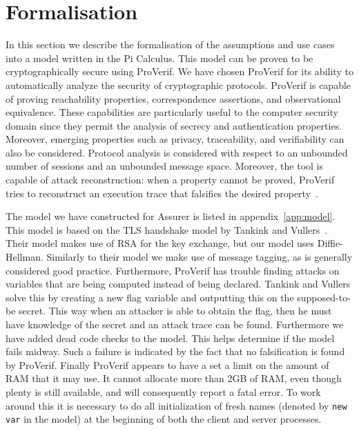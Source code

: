 \section{Formalisation}
\label{sec:formalisation}
In this section we describe the formalisation of the assumptions and use cases into a model written in the Pi Calculus. This model can be proven to be cryptographically secure using ProVerif. We have chosen ProVerif for its ability to automatically analyze the security of cryptographic protocols. ProVerif is capable of proving reachability properties, correspondence assertions, and observational equivalence. These capabilities are particularly useful to the computer security domain since they permit the analysis of secrecy and authentication properties. Moreover, emerging properties such as privacy, traceability, and verifiability can also be considered. Protocol analysis is considered with respect to an unbounded number of sessions and an unbounded message space. Moreover, the tool is capable of attack reconstruction: when a property cannot be proved, ProVerif tries to reconstruct an execution trace that falsifies the desired property~\cite{proverifmanual}.

The model we have constructed for Assurer is listed in appendix~\ref{app:model}. This model is based on the TLS handshake model by Tankink and Vullers~\cite{tankink2008verification}. Their model makes use of RSA for the key exchange, but our model uses Diffie-Hellman. Similarly to their model we make use of message tagging, as is generally considered good practice. Furthermore, ProVerif has trouble finding attacks on variables that are being computed instead of being declared. Tankink and Vullers solve this by creating a new flag variable and outputting this on the supposed-to-be secret. This way when an attacker is able to obtain the flag, then he must have knowledge of the secret and an attack trace can be found. Furthermore we have added dead code checks to the model. This helps determine if the model fails midway. Such a failure is indicated by the fact that no falsification is found by ProVerif. Finally ProVerif appears to have a set a limit on the amount of RAM that it may use. It cannot allocate more than 2GB of RAM, even though plenty is still available, and will consequently report a fatal error. To work around this it is necessary to do all initialization of fresh names (denoted by \texttt{new var} in the model) at the beginning of both the client and server processes.

